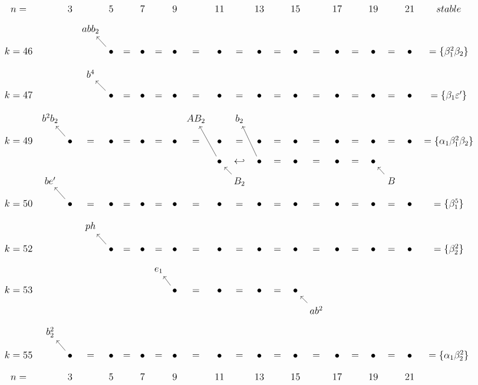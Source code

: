 \documentclass{article}
\begin{document}
\(
\begin{tikzcd}[
nodes={font=\large},
row sep=0.3cm,
column sep=0.1cm,
column 16/.append style={nodes={align=left,anchor=west}}
]
n= & & 3 & & 5 & & 7 & & 9 & & 11 & & 13 & & 15 & & 17 & & 19 & & 21 & stable & \\
& & & abb_2 & & \\ 
k=46 & & & & \bullet \arrow[lu] & = & \bullet & = & \bullet & = & \bullet & = & \bullet & = & \bullet & = & \bullet & = & \bullet & = & \bullet & = \{\beta_1^2\beta_2\} \\
& & & b^4 & & \\
k=47 & & & & \bullet \arrow[lu] & = & \bullet & = & \bullet & = & \bullet & = & \bullet & = & \bullet & = & \bullet & = & \bullet & = & \bullet & = \{\beta_1\varepsilon'\}  \\
& b^2b_2 && && && && AB_2 && b_2 \\ 
k=49 & & \bullet \arrow[lu] & = & \bullet & = & \bullet & = & \bullet & = & \bullet & = & \bullet & = & \bullet & = & \bullet & = & \bullet & = & \bullet & = \{\alpha_1\beta_1^2\beta_2\} \\
&& && && && && \bullet\arrow[luu] & \hookleftarrow & \bullet\arrow[luu] & = & \bullet & = & \bullet & = & \bullet \\
& be'  && && && && && B_2\arrow[lu] && && && && B\arrow[lu] \\ 
k=50 & & \bullet \arrow[lu] & = & \bullet & = & \bullet & = & \bullet & = & \bullet & = & \bullet & = & \bullet & = & \bullet & = & \bullet & = & \bullet & = \{\beta_1^5\} \\
& && ph & &  \\
k=52 && && \bullet \arrow[lu] & = & \bullet & = & \bullet & = & \bullet & = & \bullet & = & \bullet & = & \bullet & = & \bullet & = & \bullet & = \{\beta_2^2\} \\
& && && && e_1 &&  \\
k=53 & & & & & & & & \bullet\arrow[lu] & = & \bullet & = & \bullet & = & \bullet && && && && &  \\
& && && && && && && && ab^2\arrow[lu] \\
& b_2^2  && && && && && && && && && \\ 
k=55 & & \bullet \arrow[lu] & = & \bullet & = & \bullet & = & \bullet & = & \bullet & = & \bullet & = & \bullet & = & \bullet & = & \bullet & = & \bullet & = \{\alpha_1\beta_2^2\} \\
n= & & 3 & & 5 & & 7 & & 9 & & 11 & & 13 & & 15 & & 17 & & 19 & & 21 \\
\end{tikzcd}
\)
\end{document}
